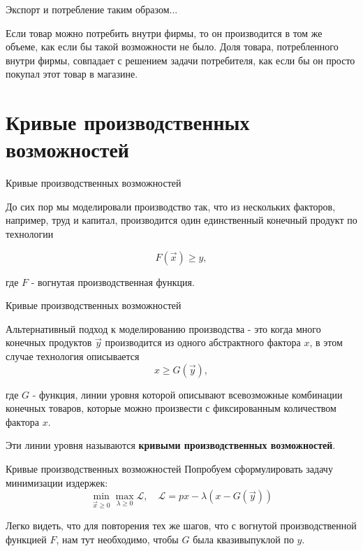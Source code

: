 \documentclass{beamer}
\begin{document}
\begin{frame}{Экспорт и потребление}
таким образом...
\begin{lemma}
	Если товар можно потребить внутри фирмы, то он производится в том же объеме, как если бы такой возможности не было. Доля товара, потребленного внутри фирмы, совпадает с решением задачи потребителя, как если бы он просто покупал этот товар в магазине.
\end{lemma}
\end{frame}

\section{Кривые производственных возможностей}

\begin{frame}{Кривые производственных возможностей}

До сих пор мы моделировали производство так, что из нескольких факторов, например, труд и капитал, производится один единственный конечный продукт по технологии 

$$ F(\vec x) \geqslant y,$$

где $F$ - вогнутая производственная функция. 

\end{frame}

\begin{frame}{Кривые производственных возможностей}

Альтернативный подход к моделированию производства - это когда много конечных продуктов $\vec y$ производится из одного абстрактного фактора $x$, в этом случае технология описывается
$$ x \geqslant G(\vec y),$$

где $G$ - функция, линии уровня которой описывают всевозможные комбинации конечных товаров, которые можно произвести с фиксированным количеством фактора $x$. 

Эти линии уровня называются \textbf{кривыми производственных возможностей}.
\end{frame}

\begin{frame}{Кривые производственных возможностей}
Попробуем сформулировать задачу минимизации издержек:
$$ \min_{\vec x \geqslant 0} \max_{\lambda \geqslant 0} \mathcal{L}, \quad \mathcal{L} = p x - \lambda (x - G(\vec y))$$

Легко видеть, что для повторения тех же шагов, что с вогнутой производственной функцией $F$, нам тут необходимо, чтобы $G$ была квазивыпуклой по $y$. 
\end{frame}
\end{document}
